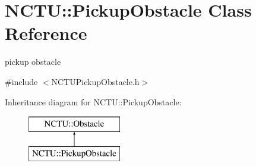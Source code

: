 \hypertarget{class_n_c_t_u_1_1_pickup_obstacle}{}\section{N\+C\+TU\+:\+:Pickup\+Obstacle Class Reference}
\label{class_n_c_t_u_1_1_pickup_obstacle}


pickup obstacle  




{\ttfamily \#include $<$N\+C\+T\+U\+Pickup\+Obstacle.\+h$>$}

Inheritance diagram for N\+C\+TU\+:\+:Pickup\+Obstacle\+:\begin{figure}[H]
\begin{center}
\leavevmode
\includegraphics[height=2.000000cm]{class_n_c_t_u_1_1_pickup_obstacle}
\end{center}
\end{figure}
